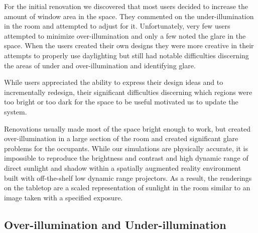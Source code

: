 \documentclass[10pt,twocolumn,letterpaper]{article}
\begin{document}
For the initial renovation we discovered that most users decided to increase the amount of window area in the space.  They commented on the under-illumination in the room and attempted to adjust for it.  Unfortunately, very few users attempted to minimize over-illumination and only a few noted the glare in the
space.
%
When the users created their own designs they were more creative in their attempts to properly use daylighting but still had notable difficulties discerning the areas of under and over-illumination and identifying glare.

While users appreciated the ability to express their design ideas and
to incrementally redesign, their significant difficulties
discerning which regions were too bright or too dark for the space to be useful
motivated us to update the system.

Renovations
usually made most of the space bright enough to work, but created
over-illumination in a large section of the room and created
significant glare problems for the occupants.  While our simulations are
physically accurate, it is impossible to reproduce the brightness and
contrast and high dynamic range of direct sunlight and shadow within a
spatially augmented reality environment built with off-the-shelf low
dynamic range projectors.  As a result, the renderings on the tabletop
are a scaled representation of sunlight in the room similar to an
image taken with a specified exposure.

\subsection{Over-illumination and Under-illumination}


\end{document}
